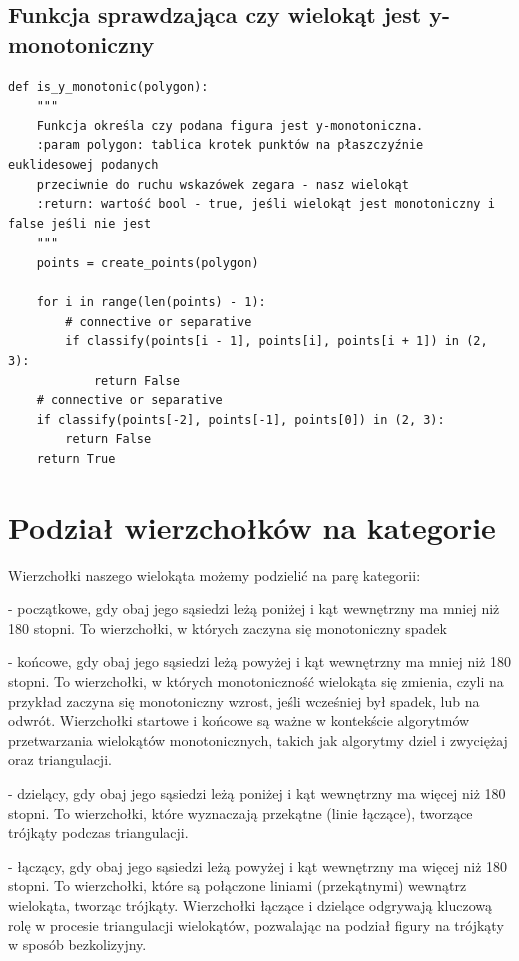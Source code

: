 \documentclass[12pt]{article}
\begin{document}
\subsection*{Funkcja sprawdzająca czy wielokąt jest y-monotoniczny}
\begin{Verbatim}
def is_y_monotonic(polygon):
	"""
	Funkcja określa czy podana figura jest y-monotoniczna.
	:param polygon: tablica krotek punktów na płaszczyźnie euklidesowej podanych 
	przeciwnie do ruchu wskazówek zegara - nasz wielokąt
	:return: wartość bool - true, jeśli wielokąt jest monotoniczny i false jeśli nie jest
	"""
	points = create_points(polygon)
	
	for i in range(len(points) - 1):
		# connective or separative
		if classify(points[i - 1], points[i], points[i + 1]) in (2, 3):
			return False
	# connective or separative
	if classify(points[-2], points[-1], points[0]) in (2, 3):
		return False
	return True
\end{Verbatim}

\newpage

\section*{Podział wierzchołków na kategorie}
\par 
Wierzchołki naszego wielokąta możemy podzielić na parę kategorii:

- początkowe, gdy obaj jego sąsiedzi leżą poniżej i kąt wewnętrzny ma mniej niż 180 stopni. To wierzchołki, w których zaczyna się monotoniczny spadek

- końcowe, gdy obaj jego sąsiedzi leżą powyżej i kąt wewnętrzny ma mniej niż 180 stopni. To wierzchołki, w których monotoniczność wielokąta się zmienia, czyli na przykład zaczyna się monotoniczny wzrost, jeśli wcześniej był spadek, lub na odwrót.
\newline\newline
Wierzchołki startowe i końcowe są ważne w kontekście algorytmów przetwarzania wielokątów monotonicznych, takich jak algorytmy dziel i zwyciężaj oraz triangulacji.

- dzielący, gdy obaj jego sąsiedzi leżą poniżej i kąt wewnętrzny ma więcej niż 180 stopni. To wierzchołki, które wyznaczają przekątne (linie łączące), tworzące trójkąty podczas triangulacji.

- łączący, gdy obaj jego sąsiedzi leżą powyżej i kąt wewnętrzny ma więcej niż 180 stopni. To wierzchołki, które są połączone liniami (przekątnymi) wewnątrz wielokąta, tworząc trójkąty.
\newline\newline
Wierzchołki łączące i dzielące odgrywają kluczową rolę w procesie triangulacji wielokątów, pozwalając na podział figury na trójkąty w sposób bezkolizyjny.
\end{document}
